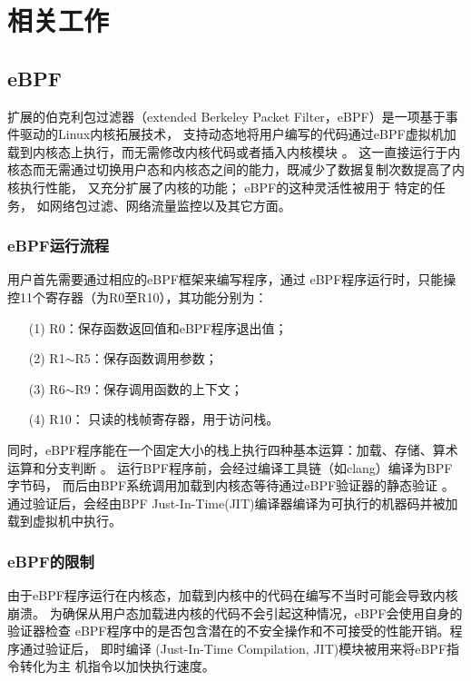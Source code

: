 \section{相关工作}
\label{section:relatedWork}
\subsection{eBPF}
    扩展的伯克利包过滤器（extended Berkeley Packet Filter，eBPF）是一项基于事件驱动的Linux内核拓展技术，
    支持动态地将用户编写的代码通过eBPF虚拟机加载到内核态上执行，而无需修改内核代码或者插入内核模块
    \cite{sunFindingCorrectnessBugs2024, YIHeCrossContainer, riceLearningEBPFProgramming2023}。
    这一直接运行于内核态而无需通过切换用户态和内核态之间的能力，既减少了数据复制次数提高了内核执行性能，
    又充分扩展了内核的功能\cite{YIHeCrossContainer, ZhangZiJunLinuxXiTonge}；
    eBPF的这种灵活性被用于 %
    特定的任务\cite{HaoValidating}，
    如网络包过滤\cite{10.1145/3371038, TCPdump}、网络流量监控\cite{9110434}以及其它方面\cite{280870, 258973}。

    \subsubsection{eBPF运行流程}
        用户首先需要通过相应的eBPF框架来编写程序，通过\cite{riceLearningEBPFProgramming2023}
        eBPF程序运行时，只能操控11个寄存器（为R0至R10），其功能分别为：
        \begin{itemize}
            \item[(1)] R0：保存函数返回值和eBPF程序退出值；
            \item[(2)] R1$\sim$R5：保存函数调用参数；
            \item[(3)] R6$\sim$R9：保存调用函数的上下文；
            \item[(4)] R10： 只读的栈帧寄存器，用于访问栈。
        \end{itemize}

        同时，eBPF程序能在一个固定大小的栈上执行四种基本运算：加载、存储、算术运算和分支判断
        \cite{HaoValidating}。
        运行BPF程序前，会经过编译工具链（如clang）编译为BPF字节码，
        而后由BPF系统调用加载到内核态等待通过eBPF验证器的静态验证
        \cite{zhengBpftimeUserspaceEBPF2023}。
        通过验证后，会经由BPF Just-In-Time(JIT)编译器编译为可执行的机器码并被加载到虚拟机中执行。

    \subsubsection{eBPF的限制}
        由于eBPF程序运行在内核态，加载到内核中的代码在编写不当时可能会导致内核崩溃。
        为确保从用户态加载进内核的代码不会引起这种情况，eBPF会使用自身的验证器检查
        eBPF程序中的是否包含潜在的不安全操作和不可接受的性能开销。程序通过验证后，
        即时编译 (Just-In-Time Compilation, JIT)模块被用来将eBPF指令转化为主
        机指令以加快执行速度\cite{FuzzOnEBPF}。


